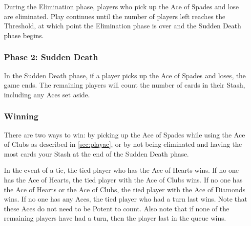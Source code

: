 \documentclass{article}
\begin{document}
During the Elimination phase, players who pick up the Ace of Spades and
lose are eliminated. Play continues until the number of players left
reaches the Threshold, at which point the Elimination phase is over and
the Sudden Death phase begins.

\subsubsection{Phase 2: Sudden Death \label{sec:sd}}

In the Sudden Death phase, if a player picks up the Ace of Spades and
loses, the game ends. The remaining players will count the number of
cards in their Stash, including any Aces set aside.

\subsubsection{Winning \label{sec:winning}}

There are two ways to win: by picking up the Ace of Spades while using
the Ace of Clubs as described in \autoref{sec:playac}, or by not being
eliminated and having the most cards your Stash at the end of the Sudden
Death phase.

In the event of a tie, the tied player who has the Ace of Hearts wins.
If no one has the Ace of Hearts, the tied player with the Ace of Clubs
wins. If no one has the Ace of Hearts or the Ace of Clubs, the tied
player with the Ace of Diamonds wins. If no one has any Aces, the tied
player who had a turn last wins. Note that these Aces do not need to be
Potent to count. Also note that if none of the remaining players have
had a turn, then the player last in the queue wins.

\newpage
\end{document}
